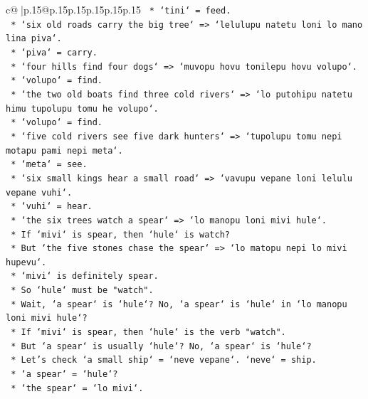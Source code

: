 \documentclass{article}
\begin{document}
{\begin{supertabular}{c@{$\;$}|p{.15\linewidth}@{}p{.15\linewidth}p{.15\linewidth}p{.15\linewidth}p{.15\linewidth}p{.15\linewidth}}
{{{\texttt{                *   `tini` = feed.} \\
\texttt{                *   `six old roads carry the big tree` => `lelulupu natetu loni lo mano lina piva`.} \\
\texttt{                *   `piva` = carry.} \\
\texttt{                *   `four hills find four dogs` => `muvopu hovu tonilepu hovu volupo`.} \\
\texttt{                *   `volupo` = find.} \\
\texttt{                *   `the two old boats find three cold rivers` => `lo putohipu natetu himu tupolupu tomu he volupo`.} \\
\texttt{                *   `volupo` = find.} \\
\texttt{                *   `five cold rivers see five dark hunters` => `tupolupu tomu nepi motapu pami nepi meta`.} \\
\texttt{                *   `meta` = see.} \\
\texttt{                *   `six small kings hear a small road` => `vavupu vepane loni lelulu vepane vuhi`.} \\
\texttt{                *   `vuhi` = hear.} \\
\texttt{                *   `the six trees watch a spear` => `lo manopu loni mivi hule`.} \\
\texttt{                *   If `mivi` is spear, then `hule` is watch?} \\
\texttt{                *   But `the five stones chase the spear` => `lo matopu nepi lo mivi hupevu`.} \\
\texttt{                *   `mivi` is definitely spear.} \\
\texttt{                *   So `hule` must be "watch".} \\
\texttt{                *   Wait, `a spear` is `hule`? No, `a spear` is `hule` in `lo manopu loni mivi hule`?} \\
\texttt{                *   If `mivi` is spear, then `hule` is the verb "watch".} \\
\texttt{                *   But `a spear` is usually `hule`? No, `a spear` is `hule`?} \\
\texttt{                *   Let's check `a small ship` = `neve vepane`. `neve` = ship.} \\
\texttt{                *   `a spear` = `hule`?} \\
\texttt{                *   `the spear` = `lo mivi`.} \\
}}}
\end{supertabular}}
\end{document}
